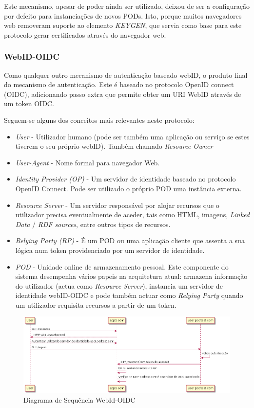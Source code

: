 Este mecanismo, apesar de poder ainda ser utilizado, deixou de ser a configuração por defeito para instanciações de novos PODs. Isto, porque muitos navegadores web removeram suporte ao elemento \emph{KEYGEN}, que servia como base para este protocolo gerar certificados através do navegador web.\cite{solid_webid-tls:}

\subsubsection{WebID-OIDC}
Como qualquer outro mecanismo de autenticação baseado webID, o produto final do mecanismo de autenticação. Este é baseado no protocolo OpenID connect (OIDC), adicionando passo extra que permite obter um URI WebID através de um token OIDC.\cite{solid_webid_oidc}

Seguem-se alguns dos conceitos mais relevantes neste protocolo:
\begin{itemize}
    \item \emph{User} - Utilizador humano (pode ser também uma aplicação ou serviço se estes tiverem o seu próprio webID). Também chamado \emph{Resource Owner}
    \item \emph{User-Agent} - Nome formal para navegador Web.
    \item \emph{Identity Provider (OP)} - Um servidor de identidade baseado no protocolo OpenID Connect. Pode ser utilizado o próprio POD uma instância externa.
    \item \emph{Resource Server} - Um servidor responsável por alojar recursos que o utilizador precisa eventualmente de aceder, tais como HTML, imagens, \emph{Linked Data} / \emph{RDF sources}, entre outros tipos de recursos.
    \item \emph{Relying Party (RP)} - É um POD ou uma aplicação cliente que assenta a sua lógica num token providenciado por um servidor de identidade.
    \item \emph{POD} - Unidade online de armazenamento pessoal. Este componente do sistema desempenha vários papeis na arquitetura atual: armazena informação do utilizador (actua como \emph{Resource Server}), instancia um servidor de identidade webID-OIDC e pode também actuar como \emph{Relying Party} quando um utilizador requisita recursos a partir de um token.
\end{itemize}

\begin{figure}[h]
    \begin{center}
    \includegraphics[width=1 \textwidth]{figures/WedId-OIDC.png}
    \caption{Diagrama de Sequência WebId-OIDC}
    \end{center}
\end{figure}

